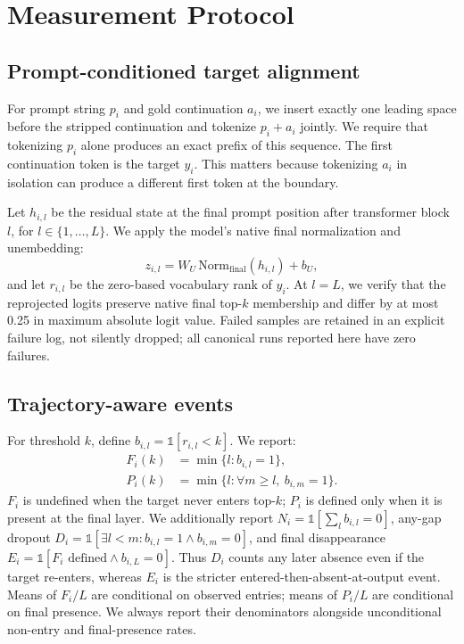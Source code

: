 \documentclass[11pt]{article}
\begin{document}
\section{Measurement Protocol}
\subsection{Prompt-conditioned target alignment}
For prompt string $p_i$ and gold continuation $a_i$, we insert exactly one leading space before the stripped continuation and tokenize $p_i+a_i$ jointly. We require that tokenizing $p_i$ alone produces an exact prefix of this sequence. The first continuation token is the target $y_i$. This matters because tokenizing $a_i$ in isolation can produce a different first token at the boundary.

Let $h_{i,l}$ be the residual state at the final prompt position after transformer block $l$, for $l\in\{1,\ldots,L\}$. We apply the model's native final normalization and unembedding:
\begin{equation}
z_{i,l} = W_U\,\mathrm{Norm}_{\mathrm{final}}(h_{i,l}) + b_U,
\end{equation}
and let $r_{i,l}$ be the zero-based vocabulary rank of $y_i$. At $l=L$, we verify that the reprojected logits preserve native final top-$k$ membership and differ by at most 0.25 in maximum absolute logit value. Failed samples are retained in an explicit failure log, not silently dropped; all canonical runs reported here have zero failures.

\subsection{Trajectory-aware events}
For threshold $k$, define $b_{i,l}=\mathbb{1}[r_{i,l}<k]$. We report:
\begin{align}
F_i(k) &= \min\{l:b_{i,l}=1\}, \\
P_i(k) &= \min\{l:\forall m\ge l,\ b_{i,m}=1\}.
\end{align}
$F_i$ is undefined when the target never enters top-$k$; $P_i$ is defined only when it is present at the final layer. We additionally report $N_i=\mathbb{1}[\sum_l b_{i,l}=0]$, any-gap dropout $D_i=\mathbb{1}[\exists l<m: b_{i,l}=1\land b_{i,m}=0]$, and final disappearance $E_i=\mathbb{1}[F_i\text{ defined}\land b_{i,L}=0]$. Thus $D_i$ counts any later absence even if the target re-enters, whereas $E_i$ is the stricter entered-then-absent-at-output event. Means of $F_i/L$ are conditional on observed entries; means of $P_i/L$ are conditional on final presence. We always report their denominators alongside unconditional non-entry and final-presence rates.
\end{document}
